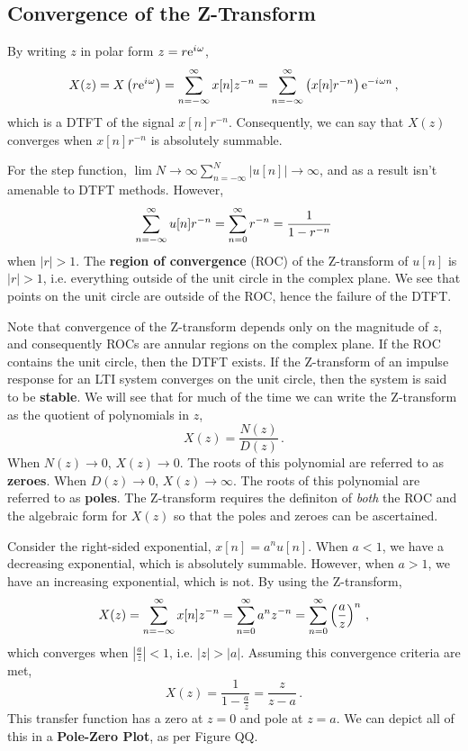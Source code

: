 \subsection{Convergence of the Z-Transform}
%
By writing $z$ in polar form $z = r\mathrm{e}^{{i\mkern1mu}\omega}$,
%
\begin{displaymath}
  X(z) = X\left(r\mathrm{e}^{{i\mkern1mu}\omega}\right) = \sum_{n=-\infty}^\infty x[n]z^{-n}
  = \sum_{n=-\infty}^\infty\left(x[n]r^{-n}\right)\mathrm{e}^{-{i\mkern1mu}\omega n} \,,
\end{displaymath}
%
which is a DTFT of the signal $x[n]r^{-n}$. Consequently, we can say
that $X(z)$ converges when $x[n]r^{-n}$ is absolutely summable.
%
\begin{exmp}
  For the step function,
  $\lim{N\rightarrow\infty}\sum_{n=-\infty}^N|u[n]|\rightarrow\infty$,
  and as a result isn't amenable to DTFT methods. However,
  \begin{displaymath}
    \sum_{n=-\infty}^\infty u[n]r^{-n} = \sum_{n=0}^\infty r^{-n} = \frac{1}{1-r^{-n}}
  \end{displaymath}
  when $|r| > 1$. The \textbf{region of convergence} (ROC) of the
  Z-transform of $u[n]$ is $|r| > 1$, i.e. everything outside of the
  unit circle in the complex plane. We see that points on the unit
  circle are outside of the ROC, hence the failure of the DTFT.
\end{exmp}
%
Note that convergence of the Z-transform depends only on the magnitude of
$z$, and consequently ROCs are annular regions on the complex plane. If
the ROC contains the unit circle, then the DTFT exists. If the Z-transform
of an impulse response for an LTI system converges on the unit circle,
then the system is said to be \textbf{stable}. We will see that for
much of the time we can write the Z-transform as the quotient of
polynomials in $z$,
%
\begin{displaymath}
  X(z) = \frac{N(z)}{D(z)} \,.
\end{displaymath}
%
When $N(z)\rightarrow 0$, $X(z)\rightarrow 0$. The roots of this
polynomial are referred to as \textbf{zeroes}. When $D(z)\rightarrow 0$,
$X(z)\rightarrow\infty$. The roots of this polynomial are referred
to as \textbf{poles}. The Z-transform requires the definiton of \textit{both} the
ROC and the algebraic form for $X(z)$ so that the poles and zeroes can
be ascertained.
%
\begin{exmp}
  Consider the right-sided exponential, $x[n] = a^n u[n]$. When $a<1$, we
  have a decreasing exponential, which is absolutely summable. However, when
  $a>1$, we have an increasing exponential, which is not. By using the
  Z-transform,
  \begin{displaymath}
    X(z) = \sum_{n=-\infty}^\infty x[n]z^{-n} = \sum_{n=0}^\infty a^n z^{-n}
    = \sum_{n=0}^\infty \left(\frac{a}{z}\right)^n \,,
  \end{displaymath}
  which converges when $\left|\frac{a}{z}\right| < 1$, i.e. $|z| > |a|$.
  Assuming this convergence criteria are met,
  \begin{displaymath}
    X(z) = \frac{1}{1 - \frac{a}{z}} = \frac{z}{z-a} \,.
  \end{displaymath}
  This transfer function has a zero at $z=0$ and pole at $z=a$. We can
  depict all of this in a \textbf{Pole-Zero Plot}, as per Figure QQ.
\end{exmp}
